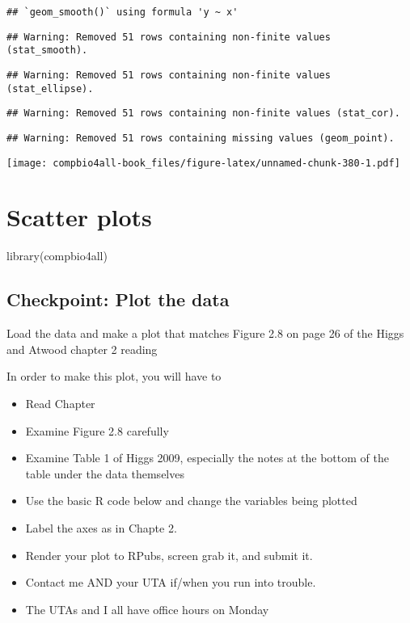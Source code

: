 \documentclass[
]{book}
\newenvironment{Shaded}{\begin{snugshade}}{\end{snugshade}}
\newcommand{\FunctionTok}[1]{\textcolor[rgb]{0.00,0.00,0.00}{#1}}
\newcommand{\NormalTok}[1]{#1}
\providecommand{\tightlist}{%
  \setlength{\itemsep}{0pt}\setlength{\parskip}{0pt}}
\begin{document}
\begin{verbatim}
## `geom_smooth()` using formula 'y ~ x'
\end{verbatim}

\begin{verbatim}
## Warning: Removed 51 rows containing non-finite values (stat_smooth).
\end{verbatim}

\begin{verbatim}
## Warning: Removed 51 rows containing non-finite values (stat_ellipse).
\end{verbatim}

\begin{verbatim}
## Warning: Removed 51 rows containing non-finite values (stat_cor).
\end{verbatim}

\begin{verbatim}
## Warning: Removed 51 rows containing missing values (geom_point).
\end{verbatim}

\texttt{[image: compbio4all-book\_files/figure-latex/unnamed-chunk-380-1.pdf]}

\hypertarget{scatter-plots}{%
\chapter{Scatter plots}\label{scatter-plots}}

\begin{Shaded}
\begin{Highlighting}[]
\FunctionTok{library}\NormalTok{(compbio4all)}
\end{Highlighting}
\end{Shaded}

\hypertarget{checkpoint-plot-the-data}{%
\section{Checkpoint: Plot the data}\label{checkpoint-plot-the-data}}

Load the data and make a plot that matches Figure 2.8 on page 26 of the Higgs and Atwood chapter 2 reading

In order to make this plot, you will have to

\begin{itemize}
\tightlist
\item
  Read Chapter
\item
  Examine Figure 2.8 carefully
\item
  Examine Table 1 of Higgs 2009, especially the notes at the bottom of the table under the data themselves
\item
  Use the basic R code below and change the variables being plotted
\item
  Label the axes as in Chapte 2.
\item
  Render your plot to RPubs, screen grab it, and submit it.
\item
  Contact me AND your UTA if/when you run into trouble.
\item
  The UTAs and I all have office hours on Monday
\end{itemize}
\end{document}
